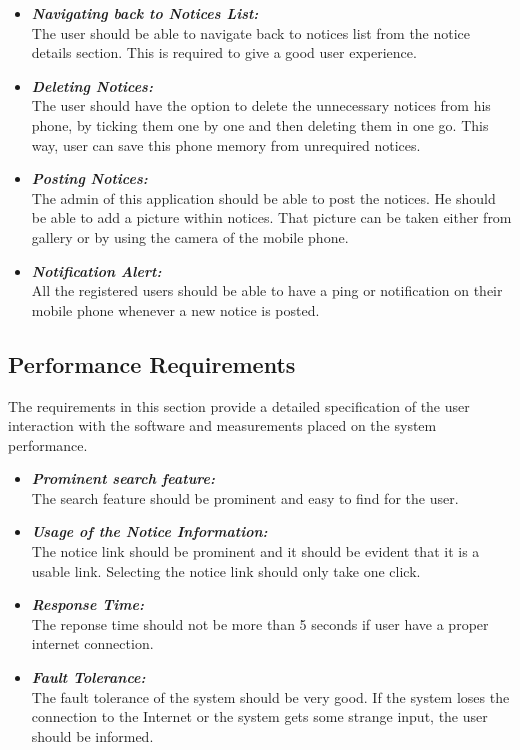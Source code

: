 \begin{itemize}
\item \textbf{\emph{Navigating back to Notices List:}}\\
The user should be able to navigate back to notices list from the notice details section. This is required to give a 
good user experience.

\item \textbf{\emph{Deleting Notices:}}\\
The user should have the option to delete the unnecessary notices from his phone, by ticking them one by one and then deleting them in one go. This way, user can save this phone memory from unrequired notices.

\item \textbf{\emph{Posting Notices:}}\\
The admin of this application should be able to post the notices. He should be able to add a picture within notices. That picture
can be taken either from gallery or by using the camera of the mobile phone.

\item \textbf{\emph{Notification Alert:}}\\
All the registered users should be able to have a ping or notification on their mobile phone whenever a new notice is posted.

\end{itemize}

\subsection{Performance Requirements}
The requirements in this section provide a detailed specification of the user interaction with the software and measurements placed on the system performance.
\begin{itemize}
\item \textbf{\emph{Prominent search feature:}}\\
The search feature should be prominent and easy to find for the user.

\item \textbf{\emph{Usage of the Notice Information:}}\\
The notice link should be prominent and it should be evident that it is a usable link.
Selecting the notice link should only take one click.

\item \textbf{\emph{Response Time:}}\\
The reponse time should not be more than 5 seconds if user have a proper internet connection. 

\item \textbf{\emph{Fault Tolerance:}}\\
The fault tolerance of the system should be very good. If the system loses the connection to the Internet or the system gets some 
strange input, the user should be informed.

\end{itemize}


